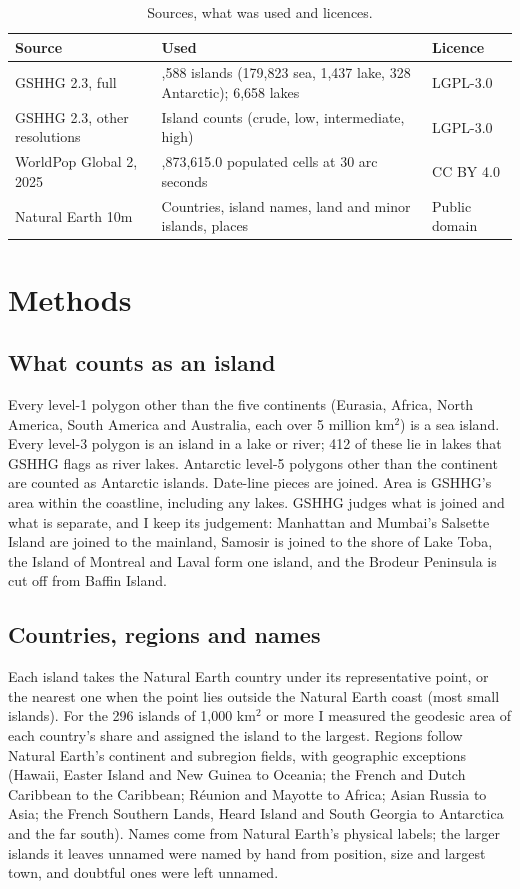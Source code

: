 \documentclass[11pt,a4paper]{article}
\begin{document}
\begin{table}[tbp]\centering\small\caption{Sources, what was used and licences.}\label{tab:sources}\begin{tabular}{>{\raggedright\arraybackslash}p{3.2cm}>{\raggedright\arraybackslash}p{7.6cm}>{\raggedright\arraybackslash}p{2.6cm}}\toprule Source & Used & Licence\\\midrule
GSHHG 2.3, full & 181,588 islands (179,823 sea, 1,437 lake, 328 Antarctic); 6,658 lakes & LGPL-3.0\\
GSHHG 2.3, other resolutions & Island counts (crude, low, intermediate, high) & LGPL-3.0\\
WorldPop Global 2, 2025 & 31,873,615.0 populated cells at 30 arc seconds & CC BY 4.0\\
Natural Earth 10m & Countries, island names, land and minor islands, places & Public domain\\
\bottomrule\end{tabular}\end{table}

\section{Methods}
\subsection{What counts as an island}
Every level-1 polygon other than the five continents (Eurasia, Africa, North America, South America and Australia, each over 5 million km$^2$) is a sea island. Every level-3 polygon is an island in a lake or river; 412 of these lie in lakes that GSHHG flags as river lakes. Antarctic level-5 polygons other than the continent are counted as Antarctic islands. Date-line pieces are joined. Area is GSHHG's area within the coastline, including any lakes. GSHHG judges what is joined and what is separate, and I keep its judgement: Manhattan and Mumbai's Salsette Island are joined to the mainland, Samosir is joined to the shore of Lake Toba, the Island of Montreal and Laval form one island, and the Brodeur Peninsula is cut off from Baffin Island.

\subsection{Countries, regions and names}
Each island takes the Natural Earth country under its representative point, or the nearest one when the point lies outside the Natural Earth coast (most small islands). For the 296 islands of 1,000 km$^2$ or more I measured the geodesic area of each country's share and assigned the island to the largest. Regions follow Natural Earth's continent and subregion fields, with geographic exceptions (Hawaii, Easter Island and New Guinea to Oceania; the French and Dutch Caribbean to the Caribbean; R\'eunion and Mayotte to Africa; Asian Russia to Asia; the French Southern Lands, Heard Island and South Georgia to Antarctica and the far south). Names come from Natural Earth's physical labels; the larger islands it leaves unnamed were named by hand from position, size and largest town, and doubtful ones were left unnamed.
\end{document}
